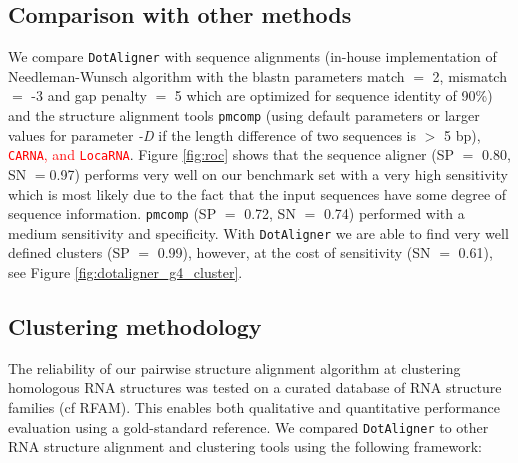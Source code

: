\documentclass[a4paper,twoside]{article}
\newcommand\dotaligner{\texttt{DotAligner}}
\newcommand\pmcomp{\texttt{pmcomp}}
\newcommand\locarna{\texttt{LocaRNA}}
\newcommand\pvclust{\texttt{pvclust}}
\newcommand\carna{\texttt{CARNA}}
\newcommand{\RED}[1]{\textcolor{red}{#1}}
\begin{document}


\subsection{Comparison with other methods}

\noindent We compare \dotaligner{} with sequence alignments (in-house
implementation of Needleman-Wunsch algorithm with the blastn parameters match
$=$ 2, mismatch $=$ -3 and gap penalty $=$ 5 which are optimized for sequence
identity of 90\%) and the structure alignment tools \pmcomp{} (using default
parameters or larger values for parameter \emph{-D} if the length difference of
two sequences is $>$ 5 bp), \RED{\carna, and \locarna}. Figure \ref{fig:roc}
shows that the sequence aligner (SP $=$ 0.80, SN $=$0.97) performs very well on
our benchmark set with a very high sensitivity which is most likely due to the
fact that the input sequences have some degree of sequence information.
\pmcomp{} (SP $=$ 0.72, SN $=$ 0.74) performed with a medium sensitivity and
specificity. With \dotaligner{} we are able to find very well defined clusters (SP
$=$ 0.99), however, at the cost of sensitivity (SN $=$ 0.61), see Figure
\ref{fig:dotaligner_g4_cluster}.

\begin{figure*}[!ht]
  \centering
  {}
  \caption{Automated hierarchical clustering of 300 sequences from 10 H/ACA
  snoRNA families. The dissimilarity matrix was calculated through \dotaligner{}
  with gap penalty 4. The clustering was conducted by the R-package \pvclust{}
  with multiscale bootstrap resampling with number of bootstrap 1000. We define
  clusters (red rectangles) as Approximately Unbiased (AU) \textit{p}-values $>$
  0.95 rejecting the hypothesis that ``the cluster does not exist`` with
  significance level 0.05.}
  \label{fig:dotaligner_g4_cluster}
\end{figure*}


\subsection{Clustering methodology} 

\noindent The reliability of our pairwise structure alignment algorithm at
clustering homologous RNA structures was tested on a curated database of RNA
structure families (cf RFAM). This enables both qualitative and quantitative
performance evaluation using a gold-standard reference. We compared
\texttt{DotAligner} to other RNA structure alignment and clustering tools using
the following framework: 
\end{document}
